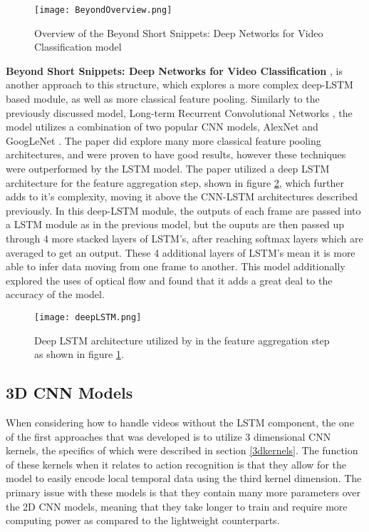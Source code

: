 \begin{figure}[h]
	\texttt{[image: BeyondOverview.png]}
	\centering
	\caption{Overview of the Beyond Short Snippets: Deep Networks for Video Classification model \cite{beyondshortsnippets}}
	\label{fig:beyondoverview}
\end{figure}

\textbf{Beyond Short Snippets: Deep Networks for Video Classification} \cite{beyondshortsnippets}, is another approach to this structure, which explores a more complex deep-LSTM based module, as well as more classical feature pooling. Similarly to the previously discussed model, Long-term Recurrent Convolutional Networks \cite{LRCNS}, the model utilizes a combination of two popular CNN models, AlexNet \cite{alexnet} and GoogLeNet \cite{googlenet}. The paper did explore many more classical feature pooling architectures, and were proven to have good results, however these techniques were outperformed by the LSTM model. The paper utilized a deep LSTM architecture for the feature aggregation step, shown in figure \ref{fig:deeplstm}, which further adds to it's complexity, moving it above the CNN-LSTM architectures described previously. In this deep-LSTM module, the outputs of each frame are passed into a LSTM module as in the previous model, but the ouputs are then passed up through 4 more stacked layers of LSTM's, after reaching softmax layers which are averaged to get an output. These 4 additional layers of LSTM's mean it is more able to infer data moving from one frame to another. This model additionally explored the uses of optical flow and found that it adds a great deal to the accuracy of the model.

\begin{figure}[h]
	\texttt{[image: deepLSTM.png]}
	\centering
	\caption{Deep LSTM architecture utilized by \cite{beyondshortsnippets} in the feature aggregation step as shown in figure \ref{fig:beyondoverview}.}
	\label{fig:deeplstm}
\end{figure}

\subsection{3D CNN Models}
\label{sec:3dCNNModels}

When considering how to handle videos without the LSTM component, the one of the first approaches that was developed is to utilize 3 dimensional CNN kernels, the specifics of which were described in section \ref{3dkernels}. The function of these kernels when it relates to action recognition is that they allow for the model to easily encode local temporal data using the third kernel dimension. The primary issue with these models is that they contain many more parameters over the 2D CNN models, meaning that they take longer to train and require more computing power as compared to the lightweight counterparts.

